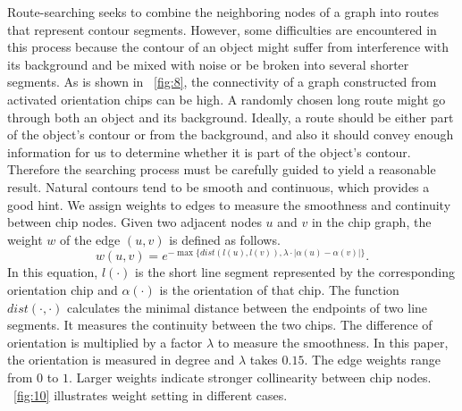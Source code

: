 \documentclass{article}
\begin{document}
Route-searching seeks to combine the neighboring nodes of a graph into routes that represent contour segments. 
However, some difficulties are encountered in this process because the contour of an object might suffer from interference with its background and be mixed with noise or be broken into several shorter segments.
As is shown in \figurename~\ref{fig:8}, 
the connectivity of a graph constructed from activated orientation chips can be high.
A randomly chosen long route might go through both an object and its background.
Ideally, a route should be either part of the object's contour or from the background,
and also it should convey enough information for us to determine whether it is part of the object's contour.
Therefore the searching process must be carefully guided to yield a reasonable result.
Natural contours tend to be smooth and continuous, which provides a good hint.
We assign weights to edges to measure the smoothness and continuity between chip nodes.
Given two adjacent nodes $u$ and $v$ in the chip graph,
the weight $w$ of the edge $(u,v)$ is defined as follows.
\begin{equation}
w(u,v) = e^{-\max\{dist(l(u), l(v)),\lambda\cdot|\alpha(u)-\alpha(v)|\}}.
\end{equation}
In this equation, $l(\cdot)$ is the short line segment represented by the corresponding orientation chip
and $\alpha(\cdot)$ is the orientation of that chip.
The function $dist(\cdot,\cdot)$ calculates the minimal distance between the endpoints of two line segments.
It measures the continuity between the two chips.
The difference of orientation is multiplied by a factor $\lambda$ to measure the smoothness.
In this paper, the orientation is measured in degree and $\lambda$ takes $0.15$.
The edge weights range from $0$ to $1$.
Larger weights indicate stronger collinearity between chip nodes.
\figurename~\ref{fig:10} illustrates weight setting in different cases.
\end{document}
